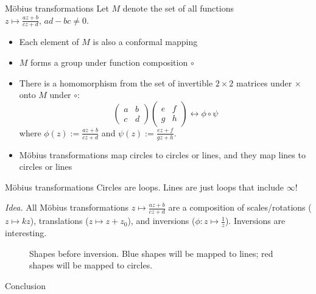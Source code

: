 \documentclass{beamer}
\begin{document}
\begin{frame}[t]{M\"{o}bius transformations} \vspace{4pt}
Let \(M\) denote the set of all functions \(z \mapsto \frac{az + b}{cz + d}, \, ad - bc \ne 0\).
\begin{itemize}
	\item Each element of \(M\) is also a conformal mapping
	\item \(M\) forms a group under function composition \(\circ\)
	\item There is a homomorphism from the set of invertible \(2 \times 2\) matrices under \(\times\) onto \(M\) under \(\circ\):
	\[
		\begin{pmatrix}a & b \\ c & d\end{pmatrix} \begin{pmatrix}e & f \\ g & h\end{pmatrix} \leftrightarrow \phi \circ \psi
	\]
	where \(\phi(z) := \frac{az + b}{cz + d}\) and \(\psi(z) := \frac{ez + f}{gz + h}\).
	\item M\"{o}bius transformations map circles to circles or lines, and they map lines to circles or lines
\end{itemize}
\end{frame}

\begin{frame}[t]{M\"{o}bius transformations}
Circles are loops. Lines are just loops that include \(\infty\)!

\textit{Idea.} All M\"{o}bius transformations \(z \mapsto \frac{az + b}{cz + d}\) are a composition of scales/rotations (\(z \mapsto kz\)), translations (\(z \mapsto z + z_0\)), and inversions (\(\phi: z \mapsto \frac{1}{z}\)). Inversions are interesting.

\begin{figure}
  	
  	\caption{Shapes before inversion. Blue shapes will be mapped to lines; red shapes will be mapped to circles.}
  	\label{fig:mobius}
\end{figure}
\end{frame}

\begin{frame}[standout]
\flushleft
Conclusion
\end{frame}
\end{document}
